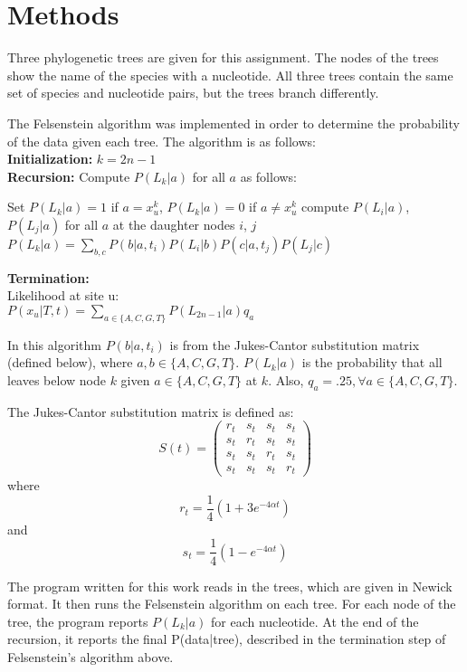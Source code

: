 \documentclass{acm_proc_article-sp}
\begin{document}
\section{Methods}
Three phylogenetic trees are given for this assignment.  The nodes of the trees show the name of the species with a nucleotide.  All three trees contain the same set of species and nucleotide pairs, but the trees branch differently.  

The Felsenstein algorithm was implemented in order to determine the probability of the data given each tree.  The algorithm is as follows:  \\
\textbf{Initialization:} $k = 2n - 1$ \\
\textbf{Recursion:} Compute $P(L_k | a)$ for all $a$ as follows: 
\begin{algorithmic}
\State Set $P(L_k | a) = 1$ if $a = x_u^k$, $P(L_k | a) = 0$ if $ a \neq x_u^k$
\Else
\State compute $P(L_i | a)$, $P(L_j | a)$ for all $a$ at the daughter nodes $i$, $j$
\State $P(L_k | a) = \sum_{b,c} P(b|a, t_i)P(L_i|b)P(c|a,t_j)P(L_j|c)$
\EndIf
\end{algorithmic}
\textbf{Termination:} \\
Likelihood at site u: \\ 
$P(x_u | T,t) = \sum\limits_{a\in \{A,C,G,T\}} P(L_{2n-1} | a)q_a$

In this algorithm $P(b|a, t_i)$ is from the Jukes-Cantor substitution matrix (defined below), where $a,b \in \{A,C,G,T\}$.  $P(L_k | a)$ is the probability that all leaves below node $k$ given $a \in \{A,C,G,T\}$ at $k$. Also, $q_a = .25, \forall a \in \{A,C,G,T\}$.

The Jukes-Cantor substitution matrix is defined as:
 \[ S(t) = \left( \begin{array}{cccc}
r_t & s_t & s_t & s_t \\
s_t & r_t & s_t & s_t \\
s_t & s_t & r_t & s_t \\
s_t & s_t & s_t & r_t \end{array} \right)\]
where 
\begin{equation} r_t = \frac{1}{4}(1+3e^{-4\alpha t})\end{equation}
and
\begin{equation} s_t = \frac{1}{4}(1-e^{-4\alpha t})\end{equation}

The program written for this work reads in the trees, which are given in Newick format.  It then runs the Felsenstein algorithm on each tree.  For each node of the tree, the program reports $P(L_k |a)$ for each nucleotide.  At the end of the recursion, it reports the final P(data|tree), described in the termination step of Felsenstein's algorithm above.  
\end{document}
